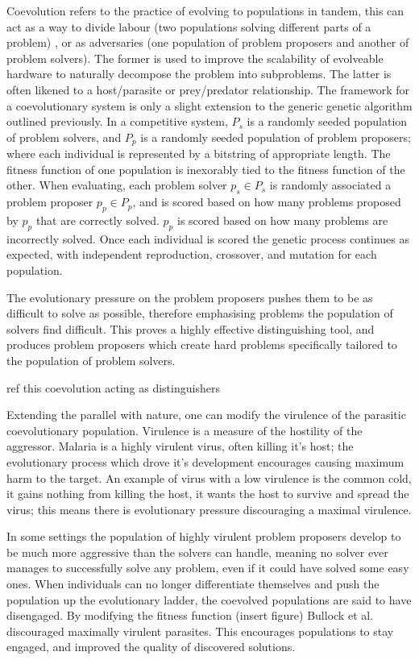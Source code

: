 Coevolution refers to the practice of evolving to populations in tandem, this can
act as a way to divide labour (two populations solving different parts of a problem)
 \cite{Potter:2000:CCA:1108888.1108890},
or as adversaries (one population of problem proposers and another of problem solvers).
The former is used to improve the scalability of evolveable hardware to naturally
decompose the problem into subproblems.
The latter is often likened to a host/parasite or prey/predator relationship.
The framework for a coevolutionary system is only a slight extension to the
generic genetic algorithm outlined previously. In a competitive system, $P_s$ is a randomly
seeded population of problem solvers, and $P_p$ is a randomly seeded population
of problem proposers; where each individual is represented by a bitstring of
appropriate length. The fitness function of one population is inexorably tied to
the fitness function of the other.
When evaluating, each problem solver $p_s \in P_s$ is randomly associated
a problem proposer $p_p \in P_p$, and is scored based on how many problems proposed by
$p_p$ that are correctly solved. $p_p$ is scored based on how many problems
are incorrectly solved. Once each individual is scored the genetic process continues as expected,
with independent reproduction, crossover, and mutation for each population.

The evolutionary pressure on the problem proposers pushes them to be as difficult
to solve as possible, therefore emphasising problems the population of solvers
find difficult. This proves a highly effective distinguishing tool, and produces
problem proposers which create hard problems specifically tailored to the population
of problem solvers.

\todo ref this coevolution acting as distinguishers

Extending the parallel with nature, one can modify the virulence of the parasitic
coevolutionary population. Virulence is a measure of the hostility of the aggressor.
Malaria is a highly virulent virus, often killing it's host; the evolutionary
process which drove it's development encourages causing maximum harm to the target.
An example of virus with a low virulence is the common cold, it gains nothing from
killing the host, it wants the host to survive and spread the virus; this means
there is evolutionary pressure discouraging a maximal virulence.

In some settings the population of highly virulent problem proposers develop to be much more
aggressive than the solvers can handle, meaning no solver ever manages to
successfully solve any problem, even if it could have solved some easy ones.
When individuals can no longer
differentiate themselves and push the population up the evolutionary ladder,
the coevolved populations are said to have disengaged.
By modifying the fitness function (\todo insert figure) Bullock et al. \cite{6790490}
discouraged maximally
virulent parasites. This encourages populations to stay engaged, and improved the
quality of discovered solutions.

